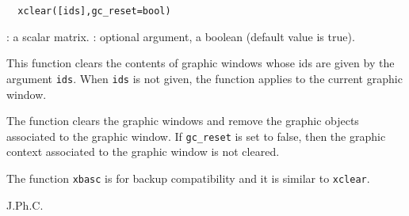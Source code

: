\begin{mandesc}
\end{mandesc}
\begin{calling_sequence}
\begin{verbatim}
  xclear([ids],gc_reset=bool)
\end{verbatim}
\end{calling_sequence}
\begin{parameters}
  \begin{varlist}
    : a scalar matrix.
    : optional argument, a boolean
    (default value is true).
  \end{varlist}
\end{parameters}
\begin{mandescription}
  This function clears the contents of graphic windows
  whose ids are given by the argument \verb!ids!.
  When \verb!ids! is not given, the function applies to
  the current graphic window.

  The function clears the graphic windows and remove the
  graphic objects associated to the graphic window.
  If \verb!gc_reset! is set to false, then the graphic context
  associated to the graphic window is not cleared.

  The function \verb!xbasc! is for backup compatibility and it is similar to \verb!xclear!.
\end{mandescription}
\begin{manseealso}
\end{manseealso}
\begin{authors}
  J.Ph.C.
\end{authors}
